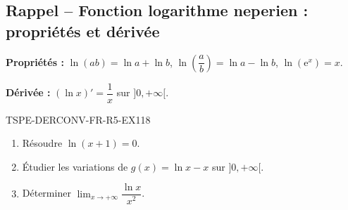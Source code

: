 

\subsection*{Rappel -- Fonction logarithme neperien : propriétés et dérivée}

\textbf{Propriétés :} $\ln(ab) = \ln a + \ln b$, $\ln\left(\dfrac{a}{b}\right) = \ln a - \ln b$, $\ln(\mathrm{e}^x) = x$.

\textbf{Dérivée :} $(\ln x)' = \dfrac{1}{x}$ sur $]0, +\infty[$.

\begin{exercice}{TSPE-DERCONV-FR-R5-EX1}{1}{8}
\begin{enumerate}
  \item Résoudre $\ln(x + 1) = 0$.
  \item Étudier les variations de $g(x) = \ln x - x$ sur $]0, +\infty[$.
  \item Déterminer $\lim_{x \to +\infty} \dfrac{\ln x}{x^2}$.
\end{enumerate}
\end{exercice}

